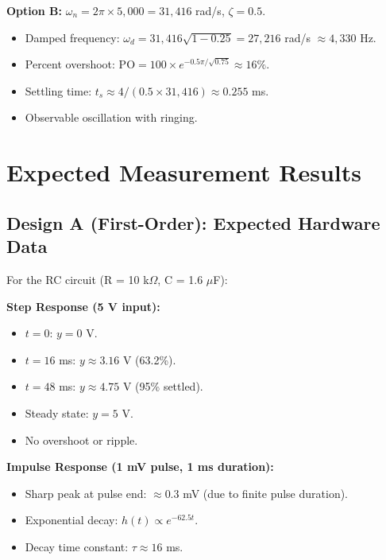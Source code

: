 \documentclass[11pt,letterpaper]{article}
\begin{document}
\noindent
\textbf{Option B:} $\omega_n = 2\pi \times 5,000 = 31,416$ rad/s, $\zeta = 0.5$.

\begin{itemize}
    \item Damped frequency: $\omega_d = 31,416 \sqrt{1 - 0.25} = 27,216$ rad/s $\approx 4,330$ Hz.
    \item Percent overshoot: $\text{PO} = 100 \times e^{-0.5 \pi / \sqrt{0.75}} \approx 16\%$.
    \item Settling time: $t_s \approx 4 / (0.5 \times 31,416) \approx 0.255$ ms.
    \item Observable oscillation with ringing.
\end{itemize}

\section{Expected Measurement Results}

\subsection{Design A (First-Order): Expected Hardware Data}

For the RC circuit (R = 10 k$\Omega$, C = 1.6 $\mu$F):

\noindent
\textbf{Step Response (5 V input):}

\begin{itemize}
    \item $t = 0$: $y = 0$ V.
    \item $t = 16$ ms: $y \approx 3.16$ V (63.2\%).
    \item $t = 48$ ms: $y \approx 4.75$ V (95\% settled).
    \item Steady state: $y = 5$ V.
    \item No overshoot or ripple.
\end{itemize}

\noindent
\textbf{Impulse Response (1 mV pulse, 1 ms duration):}

\begin{itemize}
    \item Sharp peak at pulse end: $\approx 0.3$ mV (due to finite pulse duration).
    \item Exponential decay: $h(t) \propto e^{-62.5 t}$.
    \item Decay time constant: $\tau \approx 16$ ms.
\end{itemize}
\end{document}
